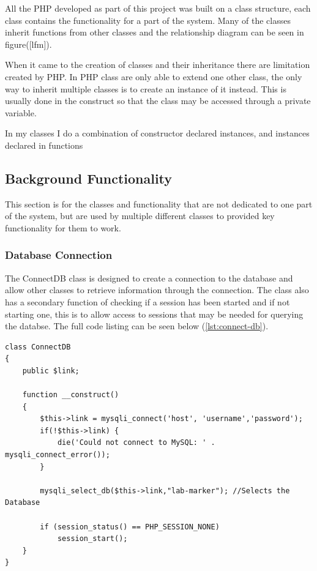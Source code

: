\documentclass[12pt]{article}  %
\begin{document}
All the PHP developed as part of this project was built on a class structure, each class contains the functionality for a part of the system. Many of the classes inherit functions from other classes and the relationship diagram can be seen in figure([lfm]). 

When it came to the creation of classes and their inheritance there are limitation created by PHP. In PHP class are only able to extend one other class, the only way to inherit multiple classes is to create an instance of it instead. This is usually done in the construct so that the class may be accessed through a private variable. 


In my classes I do a combination of constructor declared instances, and instances declared in functions






\subsection{Background Functionality}

This section is for the classes and functionality that are not dedicated to one part of the system, but are used by multiple different classes to provided key functionality for them to work.  

\subsubsection{Database Connection}

The ConnectDB class is designed to create a connection to the database and allow other classes to retrieve information through the connection. The class also has a secondary function of checking if a session has been started and if not starting one, this is to allow access to sessions that may be needed for querying the databse. The full code listing can be seen below (\ref{lst:connect-db}).

\singlespacing
\begin{lstlisting}[basicstyle=\linespread{0.8}, caption= Database Connection Class, label = lst:connect-db]
class ConnectDB
{
    public $link;

    function __construct()
    {
        $this->link = mysqli_connect('host', 'username','password');
        if(!$this->link) {
            die('Could not connect to MySQL: ' . mysqli_connect_error());
        }

        mysqli_select_db($this->link,"lab-marker"); //Selects the Database

        if (session_status() == PHP_SESSION_NONE)
            session_start();
    }
}
\end{lstlisting}
\doublespacing
\end{document}
